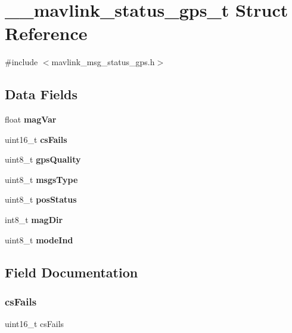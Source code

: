 \section{\+\_\+\+\_\+mavlink\+\_\+status\+\_\+gps\+\_\+t Struct Reference}
\label{struct____mavlink__status__gps__t}


{\ttfamily \#include $<$mavlink\+\_\+msg\+\_\+status\+\_\+gps.\+h$>$}

\subsection*{Data Fields}
\begin{DoxyCompactItemize}
\item 
float \textbf{ mag\+Var}
\item 
uint16\+\_\+t \textbf{ cs\+Fails}
\item 
uint8\+\_\+t \textbf{ gps\+Quality}
\item 
uint8\+\_\+t \textbf{ msgs\+Type}
\item 
uint8\+\_\+t \textbf{ pos\+Status}
\item 
int8\+\_\+t \textbf{ mag\+Dir}
\item 
uint8\+\_\+t \textbf{ mode\+Ind}
\end{DoxyCompactItemize}


\subsection{Field Documentation}
\mbox{\label{struct____mavlink__status__gps__t_a119a14610506f99a3e57fe06aaea19f1}} 
\subsubsection{cs\+Fails}
{\footnotesize\ttfamily uint16\+\_\+t cs\+Fails}

\mbox{\label{struct____mavlink__status__gps__t_a814bddc9ac07b6f11a9e2fdce58cb6ff}} 
